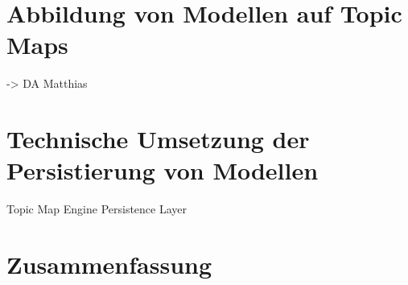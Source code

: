 
\section{Abbildung von Modellen auf Topic Maps} %
\label{sec:abbildung_von_modellen_auf_topic_maps}
-> DA Matthias

\section{Technische Umsetzung der Persistierung von Modellen} %
\label{sec:technische_umsetzung_der_persistierung_von_modellen}
Topic Map Engine Persistence Layer

\section{Zusammenfassung} %
\label{sec:persistierung_zusammenfassung}

